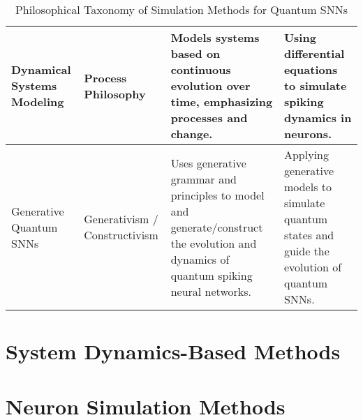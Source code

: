\begin{table}[h!]
\begin{tabular}{|p{3.5cm}|p{2.5cm}|p{4cm}|p{4cm}|}
    \hline
    Dynamical Systems Modeling & Process Philosophy & Models systems based on continuous evolution over time, emphasizing processes and change. & Using differential equations to simulate spiking dynamics in neurons. \\
    \hline
    Generative Quantum SNNs & Generativism / Constructivism & Uses generative grammar and principles to model and generate/construct the evolution and dynamics of quantum spiking neural networks. & Applying generative models 
    to simulate quantum states and guide the evolution of quantum SNNs. \\
    \hline
    \end{tabular}
    \caption{Philosophical Taxonomy of Simulation Methods for Quantum SNNs}
    \label{tab:taxonomy_simulation_methods}
\end{table}

\section{System Dynamics-Based Methods}
\section{Neuron Simulation Methods}